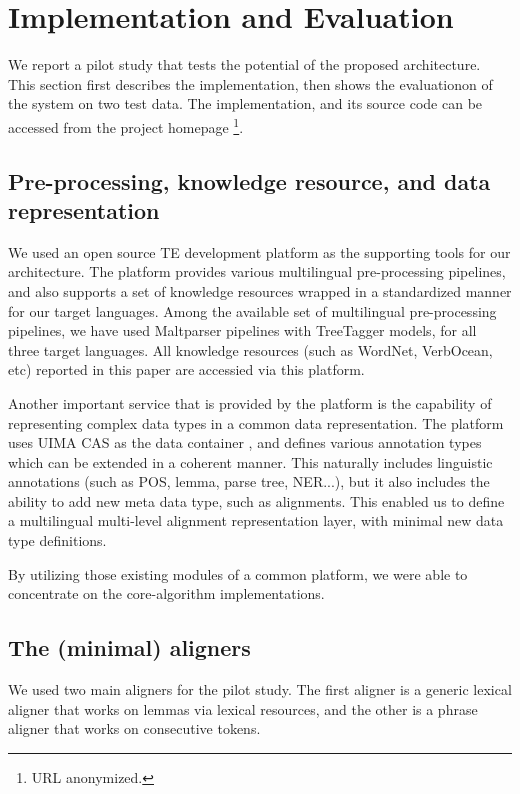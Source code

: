 \documentclass[11pt,letterpaper]{article}
\begin{document}
\section{Implementation and Evaluation}
\label{sec:impl}
We report a pilot study that tests the potential of the proposed
architecture. This section first describes the implementation, then
shows the evaluationon of the system on two test data. The
implementation, and its source code can be accessed from the
project homepage \footnote{{URL} anonymized.}.   

\subsection{Pre-processing, knowledge resource, and data
  representation}  
We used an open source TE development platform \cite{} as the
supporting tools for our architecture. The platform provides various  
multilingual pre-processing pipelines, and also supports a set of
knowledge resources wrapped in a standardized manner for our target
languages. Among the available set of multilingual pre-processing
pipelines, we have used Maltparser pipelines with TreeTagger models,
for all three target languages. All knowledge resources (such as
WordNet, VerbOcean, etc) reported in this paper are accessied via this
platform.  

Another important service that is provided by the platform is the
capability of representing complex data types in a common data
representation. The platform uses UIMA CAS as the data container
\cite{}, and defines various annotation types which can be extended in
a coherent manner. This naturally includes linguistic annotations
(such as POS, lemma, parse tree, NER...), but it also includes the
ability to add new meta data type, such as alignments. This enabled us
to define a multilingual multi-level alignment representation layer,
with minimal new data type definitions.   

By utilizing those existing modules of a common platform, we were able
to concentrate on the core-algorithm implementations. 

\subsection{The (minimal) aligners}
We used two main aligners for the pilot study. The first aligner is
a generic lexical aligner that works on lemmas via lexical resources,
and the other is a phrase aligner that works on consecutive tokens.  
\end{document}
